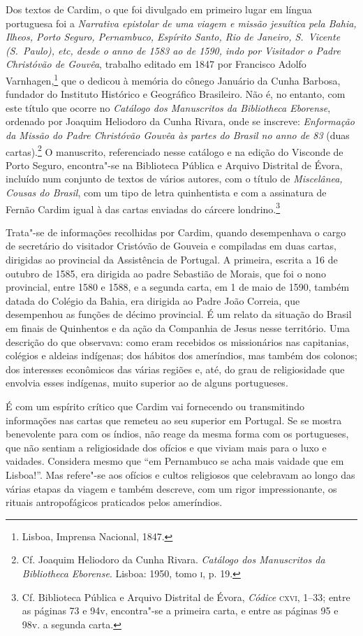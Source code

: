 Dos textos de Cardim, o que foi divulgado em primeiro lugar em língua
portuguesa foi a \textit{Narrativa epistolar de uma viagem e missão
jesuítica pela Bahia, Ilheos, Porto Seguro, Pernambuco, Espírito Santo,
Rio de Janeiro, S.~Vicente (S.~Paulo), etc, desde o anno de 1583 ao de
1590, indo por Visitador o Padre Christóvão de Gouvêa}, trabalho
editado em 1847 por Francisco Adolfo Varnhagen,\footnote{ Lisboa,
Imprensa Nacional, 1847.} que o dedicou à memória do cônego Januário da
Cunha Barbosa, fundador do Instituto Histórico e Geográfico Brasileiro.
Não é, no entanto, com este título que ocorre no \textit{Catálogo dos
Manuscritos da Bibliotheca Eborense}, ordenado por Joaquim Heliodoro da
Cunha Rivara, onde se inscreve: \textit{Enformação da Missão do Padre
Christóvão Gouvêa às partes do Brasil no anno de 83} (duas
cartas).\footnote{ Cf. Joaquim Heliodoro da Cunha Rivara.\label{cunharivara}
\textit{Catálogo dos Manuscritos da Bibliotheca Eborense}. Lisboa:
1950, tomo \textsc{i}, p. 19.} O manuscrito, referenciado nesse catálogo e na
edição do Visconde de Porto Seguro, encontra"-se na Biblioteca Pública e
Arquivo Distrital de Évora, incluído num conjunto de textos de vários
autores, com o título de \textit{Miscelânea, Cousas do Brasil}, com um
tipo de letra quinhentista e com a assinatura de Fernão Cardim igual à
das cartas enviadas do cárcere londrino.\footnote{ Cf. Biblioteca
Pública e Arquivo Distrital de Évora, \textit{Códice} \textsc{cxvi}, 1--33; 
entre as páginas 73 e 94v, encontra"-se a primeira carta, e entre
as páginas 95 e 98v. a segunda carta.}

Trata"-se de informações recolhidas por Cardim, quando desempenhava o
cargo de secretário do visitador Cristóvão de Gouveia e compiladas em
duas cartas, dirigidas ao provincial da Assistência de Portugal. A
primeira, escrita a 16 de outubro de 1585, era dirigida ao padre
Sebastião de Morais, que foi o nono provincial, entre 1580 e 1588, e a
segunda carta, em 1 de maio de 1590, também datada do Colégio da Bahia,
era dirigida ao Padre João Correia, que desempenhou as funções de
décimo provincial. É um relato da situação do Brasil em finais de
Quinhentos e da ação da Companhia de Jesus nesse território. Uma
descrição do que observava: como eram recebidos os missionários nas
capitanias, colégios e aldeias indígenas; dos hábitos dos ameríndios,
mas também dos colonos; dos interesses econômicos das várias regiões e,
até, do grau de religiosidade que envolvia esses indígenas, muito
superior ao de alguns portugueses. 

É com um espírito crítico que Cardim vai fornecendo ou transmitindo
informações nas cartas que remeteu ao seu superior em Portugal. Se se
mostra benevolente para com os índios, não reage da mesma forma com os
portugueses, que não sentiam a religiosidade dos ofícios e que viviam
mais para o luxo e vaidades. Considera mesmo que ``em
Pernambuco se acha mais vaidade que em Lisboa!''. Mas refere"-se aos
ofícios e cultos religiosos que celebravam ao longo das várias etapas
da viagem e também descreve, com um rigor impressionante, os rituais
antropofágicos praticados pelos ameríndios.

